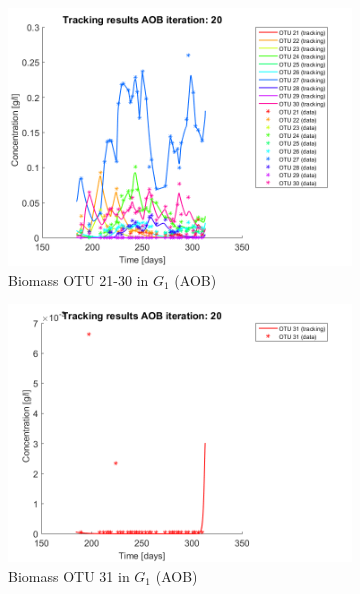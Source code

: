 \documentclass[3p,times]{article}
\begin{document}
\begin{figure}[h]
\begin{subfigure}{0.45 \textwidth}
	\includegraphics[width =\textwidth]{Application//200407_iter_20_AOB_plot_3}
	\caption{Biomass OTU 21-30 in $G_1$ (AOB) }
	\end{subfigure}
	\begin{subfigure}{0.45 \textwidth}
	\includegraphics[width =\textwidth]{Application//200407_iter_20_AOB_plot_4}
	\caption{Biomass OTU 31 in $G_1$ (AOB) }
	\end{subfigure}
	\begin{subfigure}{0.45 \textwidth}

\end{subfigure}
\end{figure}
\end{document}
